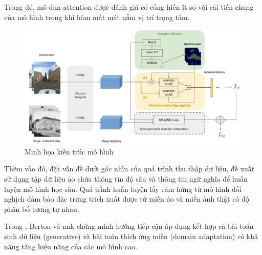 Trong đó, mô đun attention được đánh giá có cống hiến ít so với cải tiến chung của mô hình trong khi hàm mất mát nắm vị trí trọng tâm.

\begin{figure}[H]
    \centering
    \includegraphics[width=\textwidth]{pics/Chapter2/cnn160.png}
    \caption{Minh họa kiến trúc mô hình \cite{wang2019attention}}
\end{figure}

Thêm vào đó, đặt vấn đề dưới góc nhìn của quá trình thu thập dữ liệu, \cite{hu2020dasgil} đề xuất sử dụng tập dữ liệu ảo chứa thông tin độ sâu và thông tin ngữ nghĩa để huấn luyện mô hình học sâu. Quá trình huấn luyện lấy cảm hứng từ mô hình đối nghịch đảm bảo đặc trưng trích xuất được từ miền ảo và miền ảnh thật có độ phân bố tương tự nhau.

Trong \cite{PAOLICELLI-2022-FRONTIERS}, Berton và nnk chứng minh hướng tiếp cận áp dụng kết hợp cả bài toán sinh dữ liệu (generative) và bài toán thích ứng miền (domain adaptation) có khả năng tăng hiệu năng của các mô hình cao.
